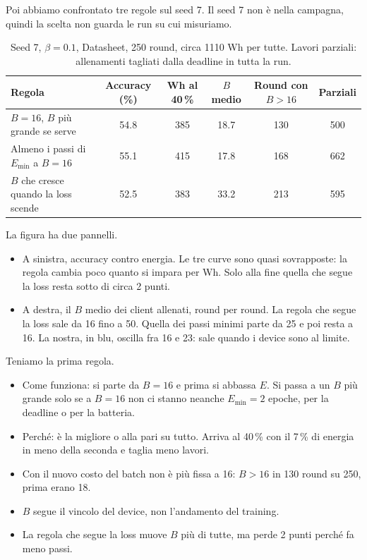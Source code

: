 \documentclass[10pt,a4paper]{article}
\begin{document}
Poi abbiamo confrontato tre regole sul seed 7. Il seed 7 non è nella campagna,
quindi la scelta non guarda le run su cui misuriamo.

\begin{table}[H]
  \centering\small
  \caption{Seed 7, $\beta = 0.1$, Datasheet, 250 round, circa 1110 Wh per
  tutte. Lavori parziali: allenamenti tagliati dalla deadline in tutta la run.}
  \begin{tabular}{lccccc}
    \toprule
    Regola & Accuracy (\%) & Wh al 40\,\% & $B$ medio & Round con $B > 16$ & Parziali \\
    \midrule
    $B = 16$, $B$ più grande se serve      & 54.8 & 385 & 18.7 & 130 & 500 \\
    Almeno i passi di $E_{\min}$ a $B = 16$ & 55.1 & 415 & 17.8 & 168 & 662 \\
    $B$ che cresce quando la loss scende    & 52.5 & 383 & 33.2 & 213 & 595 \\
    \bottomrule
  \end{tabular}
\end{table}

La figura ha due pannelli.
\begin{itemize}
  \item A sinistra, accuracy contro energia. Le tre curve sono quasi
        sovrapposte: la regola cambia poco quanto si impara per Wh. Solo alla
        fine quella che segue la loss resta sotto di circa 2 punti.
  \item A destra, il $B$ medio dei client allenati, round per round. La regola
        che segue la loss sale da 16 fino a 50. Quella dei passi minimi parte da
        25 e poi resta a 16. La nostra, in blu, oscilla fra 16 e 23: sale quando
        i device sono al limite.
\end{itemize}

Teniamo la prima regola.
\begin{itemize}
  \item Come funziona: si parte da $B = 16$ e prima si abbassa $E$. Si passa a
        un $B$ più grande solo se a $B = 16$ non ci stanno neanche $E_{\min} = 2$
        epoche, per la deadline o per la batteria.
  \item Perché: è la migliore o alla pari su tutto. Arriva al 40\,\% con il
        7\,\% di energia in meno della seconda e taglia meno lavori.
  \item Con il nuovo costo del batch non è più fissa a 16: $B > 16$ in 130 round
        su 250, prima erano 18.
  \item $B$ segue il vincolo del device, non l'andamento del training.
  \item La regola che segue la loss muove $B$ più di tutte, ma perde 2 punti
        perché fa meno passi.
\end{itemize}
\end{document}
